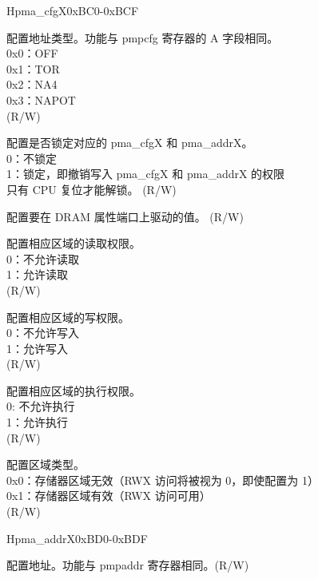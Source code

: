 
\begin{register}{H}{pma\_cfgX}{0xBC0-0xBCF}
\label{regdesc:pma_cfgX}
%
%
%
%
%
%
%
%
%
%
\regnewline%
\begin{regdesc}
\begin{reglist}
\label{fielddesc:A}\item [A] 配置地址类型。功能与 pmpcfg 寄存器的 A 字段相同。\\
0x0：OFF\\
0x1：TOR\\
0x2：NA4\\
0x3：NAPOT\\
(R/W)
\label{fielddesc:LOCK}\item [LOCK] 配置是否锁定对应的 pma\_cfgX 和 pma\_addrX。\\
0：不锁定\\
1：锁定，即撤销写入 pma\_cfgX 和 pma\_addrX 的权限\\
只有 CPU 复位才能解锁。 (R/W)
\label{fielddesc:ATTRIBUTE}\item [ATTRIBUTE] 配置要在 DRAM 属性端口上驱动的值。 (R/W)
\label{fielddesc:READ}\item [READ] 配置相应区域的读取权限。\\
0：不允许读取\\
1：允许读取\\
(R/W)
\label{fielddesc:WRITE}\item [WRITE] 配置相应区域的写权限。\\
0：不允许写入\\
1：允许写入\\
(R/W)
\label{fielddesc:EXECUTE}\item [EXECUTE] 配置相应区域的执行权限。\\
0: 不允许执行\\
1：允许执行\\
(R/W)
\label{fielddesc:TYPE}\item [TYPE] 配置区域类型。\\
0x0：存储器区域无效（RWX 访问将被视为 0，即使配置为 1）\\
0x1：存储器区域有效（RWX 访问可用）\\
(R/W)
\end{reglist}
\end{regdesc}
\end{register}

\begin{register}{H}{pma\_addrX}{0xBD0-0xBDF}
\label{regdesc:pma_addrX}
%
\regnewline%
\begin{regdesc}
\begin{reglist}
\label{fielddesc:ADDR}\item [ADDR] 配置地址。功能与 pmpaddr 寄存器相同。(R/W)
\end{reglist}
\end{regdesc}
\end{register}
